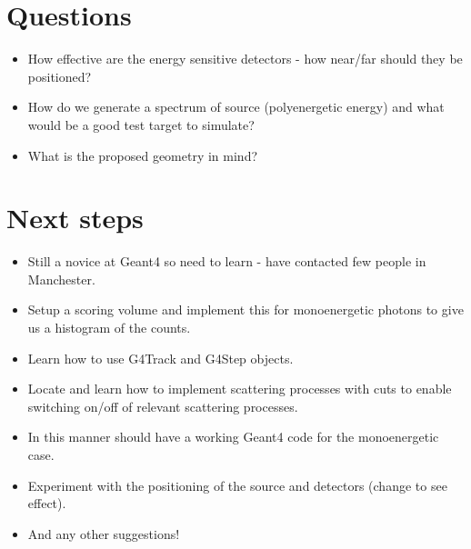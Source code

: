 \documentclass[12pt,twoside]{article}
\begin{document}
\section*{Questions}

\begin{itemize}
 \item How effective are the energy sensitive detectors - how near/far should they be positioned?
 \item How do we generate a spectrum of source (polyenergetic energy) and what would be a good test target to simulate?
 \item What is the proposed geometry in mind?
\end{itemize}

\section*{Next steps}

\begin{itemize}
 \item Still a novice at Geant4 so need to learn - have contacted few people in Manchester.
 \item Setup a scoring volume and implement this for monoenergetic photons to give us a histogram of the counts.
 \item Learn how to use G4Track and G4Step objects.
 \item Locate and learn how to implement scattering processes with cuts to enable switching on/off of relevant scattering processes.
 \item In this manner should have a working Geant4 code for the monoenergetic case.
 \item Experiment with the positioning of the source and detectors (change to see effect).
 \item And any other suggestions!
\end{itemize}



\end{document}
